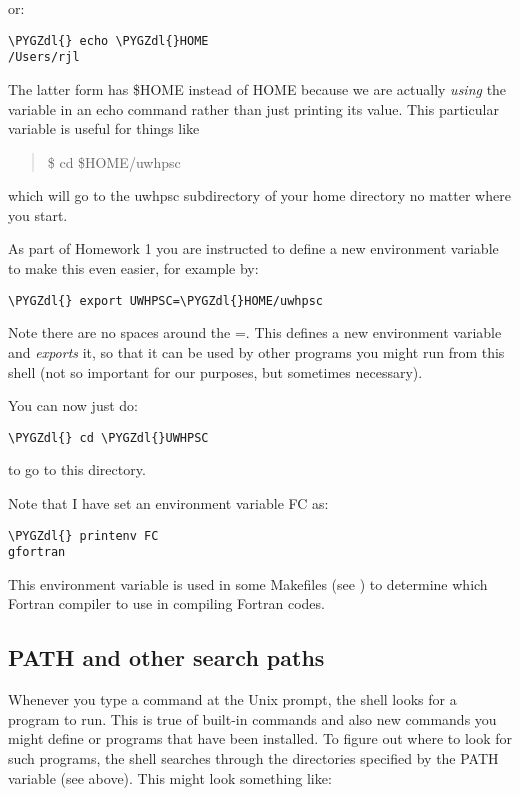 \documentclass[letterpaper,10pt,english]{sphinxmanual}
\def\PYGZdl{\char`\$}
\begin{document}
or:

\begin{Verbatim}[commandchars=\\\{\}]
\PYGZdl{} echo \PYGZdl{}HOME
/Users/rjl
\end{Verbatim}

The latter form has \$HOME instead of HOME because we are actually \emph{using}
the variable in an echo command rather than just printing its value.  This
particular variable is useful for things like
\begin{quote}

\$ cd \$HOME/uwhpsc
\end{quote}

which will go to the uwhpsc subdirectory of your home directory no
matter where you start.

As part of Homework 1 you are instructed to define a new environment
variable to make this even easier,  for example by:

\begin{Verbatim}[commandchars=\\\{\}]
\PYGZdl{} export UWHPSC=\PYGZdl{}HOME/uwhpsc
\end{Verbatim}

Note there are no spaces around the =.   This defines a new environment
variable and \emph{exports} it, so that it can be used by other programs you
might run from this shell (not so important for our purposes, but sometimes
necessary).

You can now just do:

\begin{Verbatim}[commandchars=\\\{\}]
\PYGZdl{} cd \PYGZdl{}UWHPSC
\end{Verbatim}

to go to this directory.

Note that I have set an environment variable FC as:

\begin{Verbatim}[commandchars=\\\{\}]
\PYGZdl{} printenv FC
gfortran
\end{Verbatim}

This environment variable is used in some Makefiles (see {\hyperref[makefiles:makefiles]{}})
to determine which Fortran compiler to use in compiling Fortran codes.


\subsection{PATH and other search paths}
\label{unix:path-and-other-search-paths}\label{unix:unix-path}
Whenever you type a command at the Unix prompt, the shell looks for a
program to run.  This is true of built-in commands and also new commands you
might define or programs that have been installed.  To figure out where to
look for such programs, the shell searches through the directories specified
by the PATH variable (see {\hyperref[unix:env]{}} above).  This might look something
like:
\end{document}
